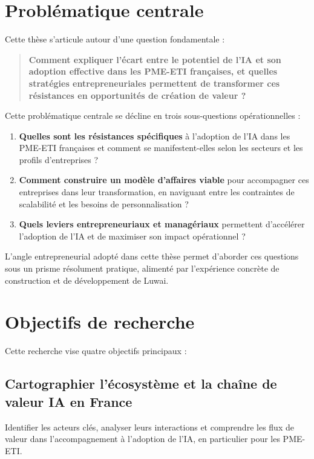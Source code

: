 \section{Problématique centrale}

Cette thèse s'articule autour d'une question fondamentale :

\begin{quote}
\textbf{Comment expliquer l'écart entre le potentiel de l'IA et son adoption effective dans les PME-ETI françaises, et quelles stratégies entrepreneuriales permettent de transformer ces résistances en opportunités de création de valeur ?}
\end{quote}

Cette problématique centrale se décline en trois sous-questions opérationnelles :

\begin{enumerate}
    \item \textbf{Quelles sont les résistances spécifiques} à l'adoption de l'IA dans les PME-ETI françaises et comment se manifestent-elles selon les secteurs et les profils d'entreprises ?
    \item \textbf{Comment construire un modèle d'affaires viable} pour accompagner ces entreprises dans leur transformation, en naviguant entre les contraintes de scalabilité et les besoins de personnalisation ?
    \item \textbf{Quels leviers entrepreneuriaux et managériaux} permettent d'accélérer l'adoption de l'IA et de maximiser son impact opérationnel ?
\end{enumerate}

L'angle entrepreneurial adopté dans cette thèse permet d'aborder ces questions sous un prisme résolument pratique, alimenté par l'expérience concrète de construction et de développement de Luwai.

\section{Objectifs de recherche}

Cette recherche vise quatre objectifs principaux :

\subsection{Cartographier l'écosystème et la chaîne de valeur IA en France}
Identifier les acteurs clés, analyser leurs interactions et comprendre les flux de valeur dans l'accompagnement à l'adoption de l'IA, en particulier pour les PME-ETI.

